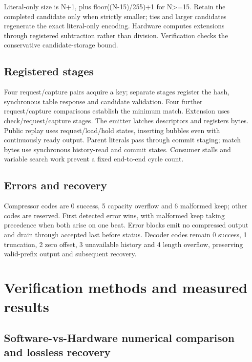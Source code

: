 \documentclass[11pt,a4paper]{article}
\begin{document}
Literal-only size is N+\allowbreak{}1,\allowbreak{} plus floor(\allowbreak{}(\allowbreak{}N-15)\allowbreak{}/\allowbreak{}255)\allowbreak{}+\allowbreak{}1 for N>=\allowbreak{}15. Retain the completed candidate only when strictly smaller; ties and larger candidates regenerate the exact literal-only encoding. Hardware computes extensions through registered subtraction rather than division. Verification checks the conservative candidate-storage bound.

\subsection{Registered stages}

Four request/\allowbreak{}capture pairs acquire a key; separate stages register the hash,\allowbreak{} synchronous table response and candidate validation. Four further request/\allowbreak{}capture comparisons establish the minimum match. Extension uses check/\allowbreak{}request/\allowbreak{}capture stages. The emitter latches descriptors and registers bytes. Public replay uses request/\allowbreak{}load/\allowbreak{}hold states,\allowbreak{} inserting bubbles even with continuously ready output. Parent literals pass through commit staging; match bytes use synchronous history-read and commit states. Consumer stalls and variable search work prevent a fixed end-to-end cycle count.

\subsection{Errors and recovery}

Compressor codes are 0 success,\allowbreak{} 5 capacity overflow and 6 malformed keep; other codes are reserved. First detected error wins,\allowbreak{} with malformed keep taking precedence when both arise on one beat. Error blocks emit no compressed output and drain through accepted last before status. Decoder codes remain 0 success,\allowbreak{} 1 truncation,\allowbreak{} 2 zero offset,\allowbreak{} 3 unavailable history and 4 length overflow,\allowbreak{} preserving valid-prefix output and subsequent recovery.

\section{Verification methods and measured results}

\subsection{Software-vs-Hardware numerical comparison and lossless recovery}
\end{document}
